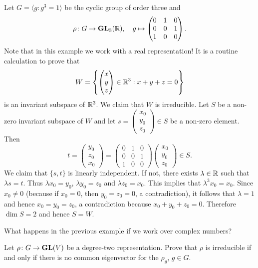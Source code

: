 \begin{example}
    Let $G=\langle g:g^3=1\rangle$ be the
    cyclic group of order three
    and
    \[
    \rho\colon G\to\mathbf{GL}_3(\mathbb{R}),
    \quad
    g\mapsto\begin{pmatrix}
        0&1&0\\
        0&0&1\\
        1&0&0
    \end{pmatrix}.
    \]
    Note that in this example we work with a real representation! 
    It is a routine calculation to prove that 
    \[
    W=\left\{
    \begin{pmatrix}
    x\\
    y\\
    z
    \end{pmatrix}\in\mathbb{R}^3:x+y+z=0\right\}
    \]
    is an invariant subspace of $\mathbb{R}^3$. We claim that $W$ 
    is irreducible. Let $S$ be a non-zero invariant subspace of 
    $W$ and let $s=\begin{pmatrix}x_0\\y_0\\z_0\end{pmatrix}\in S$ be a non-zero element. Then
    \[
    t=\begin{pmatrix}y_0\\z_0\\x_0\end{pmatrix}
    =\begin{pmatrix}
        0&1&0\\
        0&0&1\\
        1&0&0
    \end{pmatrix}
    \begin{pmatrix}x_0\\y_0\\z_0\end{pmatrix}\in S.
    \]
    We claim that $\{s,t\}$ is linearly independent. If not, there exists $\lambda\in\mathbb{R}$ such that
    $\lambda s=t$. Thus $\lambda x_0=y_0$, $\lambda y_0=z_0$ and $\lambda z_0=x_0$. This implies that
    $\lambda^3x_0=x_0$. Since $x_0\ne 0$ (because if $x_0=0$, then $y_0=z_0=0$, a contradiction), it follows that
    $\lambda=1$ and hence $x_0=y_0=z_0$, a contradiction because $x_0+y_0+z_0=0$.
    Therefore $\dim S=2$ and hence $S=W$.
\end{example}

What happens in the previous example if we work over complex numbers?

\begin{exercise}
    Let $\rho\colon G\to\mathbf{GL}(V)$ be a degree-two representation. Prove that
    $\rho$ is irreducible if and only if there is no common eigenvector for the $\rho_g$, $g\in G$.
\end{exercise}

